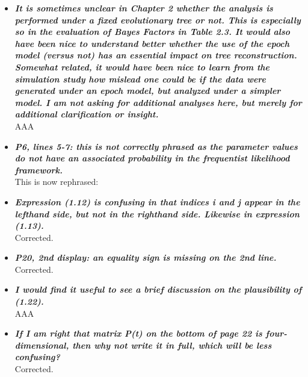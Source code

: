 \documentclass[english]{article}
\begin{document}
\begin{itemize}
\item {
{\it
\textbf{
It is sometimes unclear in Chapter 2 whether the analysis is performed under a fixed evolutionary tree or not. 
This is especially so in the evaluation of Bayes Factors in Table 2.3. 
It would also have been nice to understand better whether the use of the epoch model (versus not) has an essential impact on tree reconstruction. 
Somewhat related, it would have been nice to learn from the simulation study how mislead one could be if the data were generated under an epoch model, but analyzed under a simpler model. 
I am not asking for additional analyses here, but merely for additional clarification or insight.
}%
}%
}%
\\
AAA



\item {
{\it
\textbf{
P6, lines 5-7: this is not correctly phrased as the parameter values do not have an associated probability in the frequentist likelihood framework.
}%
}%
}%
\\
This is now rephrased:

\begin{quote}
\myeditsvthree
\end{quote}


\item {
{\it
\textbf{
Expression (1.12) is confusing in that indices i and j appear in the lefthand side, but not in the righthand side. 
Likewise in expression (1.13).
}%
}%
}%
\\
Corrected.



\item {
{\it
\textbf{
P20, 2nd display: an equality sign is missing on the 2nd line.
}%
}%
}%
\\
Corrected.

\item {
{\it
\textbf{
I would find it useful to see a brief discussion on the plausibility of (1.22).
}%
}%
}%
\\
AAA


\item {
{\it
\textbf{
If I am right that matrix P(t) on the bottom of page 22 is four-dimensional, then why not write it in full, which will be less confusing?
}%
}%
}%
\\
Corrected.





\end{itemize}
\end{document}
